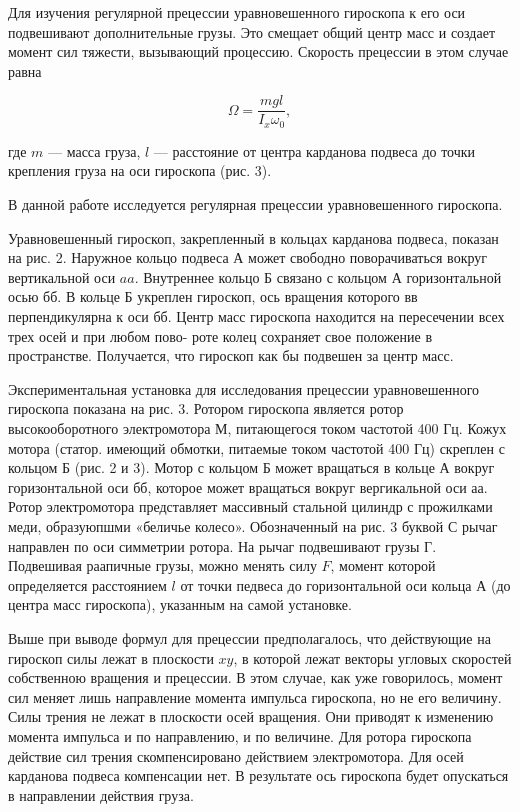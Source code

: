 \documentclass[14pt]{article}
\begin{document}
Для изучения регулярной прецессии уравновешенного гироскопа к его оси подвешивают дополнительные грузы. Это смещает общий центр масс и создает момент сил тяжести, вызывающий процессию. Скорость прецессии в этом случае равна

\begin{equation}
\Omega = \frac{mgl}{I_x\omega_0},
\end{equation}

\noindent где $m$ --- масса груза, $l$ --- расстояние от центра карданова подвеса до точки крепления груза на оси гироскопа (рис. 3).

В данной работе исследуется регулярная прецессии уравновешенного гироскопа.

Уравновешенный гироскоп, закрепленный в кольцах карданова подвеса, показан на рис. 2. Наружное кольцо подвеса А может свободно поворачиваться вокруг вертикальной оси $aa$. Внутреннее кольцо Б связано с кольцом А горизонтальной осью $\text{бб}$. В кольце Б укреплен гироскоп, ось вращения которого $\text{вв}$ перпендикулярна к оси $\text{бб}$. Центр масс гироскопа находится на пересечении всех трех осей и при любом пово-
роте колец сохраняет свое положение в пространстве. Получается, что гироскоп как бы подвешен за центр масс.

Экспериментальная установка для исследования прецессии уравновешенного гироскопа показана на рис. 3. Ротором гироскопа является ротор высокооборотного электромотора М, питающегося током частотой 400 Гц. Кожух мотора (статор. имеющий обмотки, питаемые током частотой 400 Гц) скреплен с кольцом Б (рис. 2 и 3). Мотор с кольцом Б может вращаться в кольце А вокруг горизонтальной оси $\text{бб}$, которое может вращаться вокруг вергикальной оси $\text{аа}$. Ротор электромотора представляет массивный стальной цилиндр с прожилками меди, образуюпшми «беличье колесо». Обозначенный на рис. 3 буквой С рычаг направлен по оси симметрии ротора. На рычаг подвешивают грузы Г. Подвешивая раапичные грузы, можно менять силу $F$, момент которой определяется расстоянием $l$ от точки педвеса до горизонтальной оси кольца А (до центра масс гироскопа), указанным на самой установке.

Выше при выводе формул для прецессии предполагалось, что действующие на гироскоп силы лежат в плоскости $xy$, в которой лежат векторы угловых скоростей собственною вращения и прецессии. В этом случае, как уже говорилось, момент сил меняет лишь направление момента импульса гироскопа, но не его величину. Силы трения не лежат в плоскости осей вращения. Они приводят к изменению момента импульса и по направлению, и по величине. Для ротора гироскопа действие сил трения скомпенсировано действием электромотора. Для осей карданова подвеса компенсации нет. В результате ось гироскопа будет опускаться в направлении действия груза. 
\end{document}
